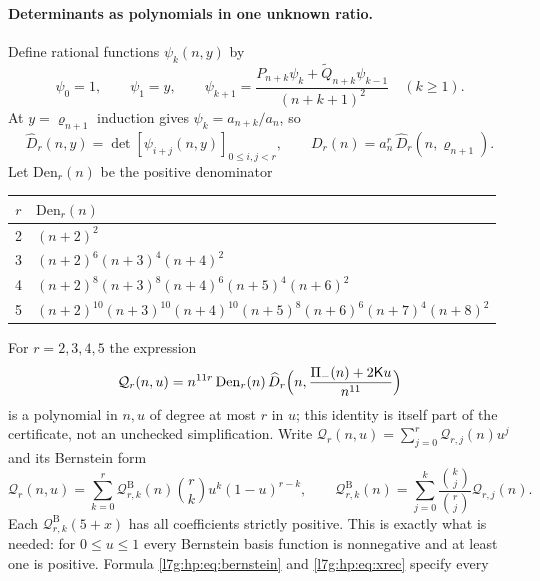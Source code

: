 \documentclass[11pt,letterpaper]{article}
\theoremstyle{remark}\newtheorem{remark}[theorem]{Remark}
\newcounter{l7gtrsavedeq}
\begin{document}
\paragraph{Determinants as polynomials in one unknown ratio.}
Define rational functions $\psi_k(n,y)$ by
\begin{equation}\label{l7g:hp:eq:xrec}
 \psi_0=1,\qquad \psi_1=y,\qquad
 \psi_{k+1}=\frac{P_{n+k}\psi_k+\widetilde Q_{n+k}\psi_{k-1}}{(n+k+1)^2}\quad(k\ge1).
\end{equation}
At $y=\varrho_{n+1}$ induction gives $\psi_k=a_{n+k}/a_n$, so
\begin{equation}\label{l7g:hp:eq:normalizeddet}
 \widehat D_r(n,y)=\det[\psi_{i+j}(n,y)]_{0\le i,j<r},\qquad
 D_r(n)=a_n^r\,\widehat D_r(n,\varrho_{n+1}).
\end{equation}
Let $\mathrm{Den}_r(n)$ be the positive denominator
\begin{center}\small
\begin{tabular}{cl}
\toprule
$r$ & $\mathrm{Den}_r(n)$\\
\midrule
2 & $(n+2)^2$\\
3 & $(n+2)^6(n+3)^4(n+4)^2$\\
4 & $(n+2)^8(n+3)^8(n+4)^6(n+5)^4(n+6)^2$\\
5 & $(n+2)^{10}(n+3)^{10}(n+4)^{10}(n+5)^8(n+6)^6(n+7)^4(n+8)^2$\\
\bottomrule
\end{tabular}
\end{center}
For $r=2,3,4,5$ the expression
\begin{equation}\label{l7g:hp:eq:Qr}
 \mathcal Q_r(n,u)=n^{11r}\,\mathrm{Den}_r(n)\,
 \widehat D_r\Bigl(n,\frac{\Pi_-(n)+2\mathsf Ku}{n^{11}}\Bigr)
\end{equation}
is a polynomial in $n,u$ of degree at most $r$ in $u$; this identity is
itself part of the certificate, not an unchecked simplification. Write
$\mathcal Q_r(n,u)=\sum_{j=0}^r\mathcal Q_{r,j}(n)u^j$ and its Bernstein form
\begin{equation}\label{l7g:hp:eq:bernstein}
 \mathcal Q_r(n,u)=\sum_{k=0}^r\mathcal Q^{\mathrm B}_{r,k}(n)\binom rk u^k(1-u)^{r-k},
 \qquad
 \mathcal Q^{\mathrm B}_{r,k}(n)=\sum_{j=0}^k\frac{\binom kj}{\binom rj}\mathcal Q_{r,j}(n).
\end{equation}
Each $\mathcal Q^{\mathrm B}_{r,k}(5+x)$ has all coefficients strictly
positive. This is exactly what is needed: for $0\le u\le1$ every Bernstein
basis function is nonnegative and at least one is positive. Formula
\eqref{l7g:hp:eq:bernstein} and \eqref{l7g:hp:eq:xrec} specify every
\end{document}
